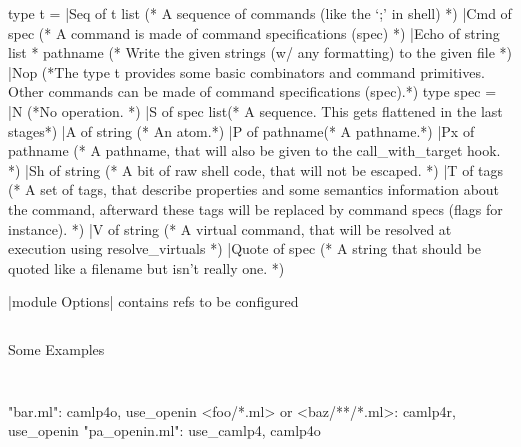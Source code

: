 \begin{ocamlcode}
type t =
  |Seq of t list
  (* A sequence of commands (like the `;' in shell) *)
  |Cmd of spec
  (* A command is made of command specifications (spec) *)
  |Echo of string list * pathname
  (* Write the given strings (w/ any formatting) to the given file *)
  |Nop
  (*The type t provides some basic combinators and command
    primitives. Other commands can be made of command specifications
    (spec).*)
type spec =
  |N (*No operation.	*)
  |S of spec list(* A sequence. This gets flattened in the last stages*)
  |A of string	(* An atom.*)
  |P of pathname(* A pathname.*)
  |Px of pathname
  (* A pathname, that will also be given to the call_with_target
     hook. *)
  |Sh of string
  (* A bit of raw shell code, that will not be escaped. *)
  |T of tags
  (* A set of tags, that describe properties and some semantics
     information about the command, afterward these tags will be replaced
     by command specs (flags for instance). *)
  |V of string
  (* A virtual command, that will be resolved at execution using
     resolve_virtuals *)
  |Quote of spec
  (* A string that should be quoted like a filename but isn't really
   one. *)
\end{ocamlcode}

|module Options| contains refs to be configured
\inputminted[fontsize=\scriptsize, ]{ocaml}{code/ocamlbuild/options.mli}

Some Examples

\inputminted[fontsize=\scriptsize, ]{ocaml}{code/ocamlbuild/myocamlbuild.2.ml}
\inputminted[fontsize=\scriptsize, ]{ocaml}{code/ocamlbuild/myocamlbuild.3.ml}

\begin{bluetext}
 "bar.ml": camlp4o, use_openin
 <foo/*.ml> or <baz/**/*.ml>: camlp4r, use_openin
 "pa_openin.ml": use_camlp4, camlp4o  
\end{bluetext}

\inputminted[fontsize=\scriptsize, ]{ocaml}{code/ocamlbuild/myocamlbuild.4.ml}
\inputminted[fontsize=\scriptsize, ]{ocaml}{code/ocamlbuild/myocamlbuild.5.ml}

